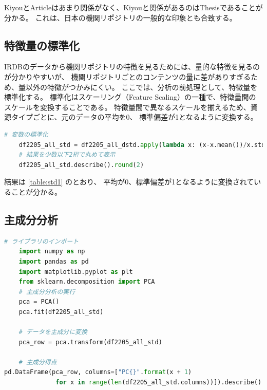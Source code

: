 \documentclass[submit,noauthor]{ono}
\begin{document}
KiyouとArticleはあまり関係がなく、Kiyouと関係があるのはThesisであることが分かる。
これは、日本の機関リポジトリの一般的な印象とも合致する。

\subsection{特徴量の標準化}

IRDBのデータから機関リポジトリの特徴を見るためには、量的な特徴を見るのが分かりやすいが、
機関リポジトリごとのコンテンツの量に差がありすぎるため、量以外の特徴がつかみにくい。
ここでは、分析の前処理として、特徴量を標準化する。
標準化はスケーリング（Feature Scaling）の一種で、特徴量間のスケールを変換することである。
特徴量間で異なるスケールを揃えるため、資源タイプごとに、元のデータの平均を0、
標準偏差が1となるように変換する。

\begin{lstlisting}[language=Python,breaklines]
	# 変数の標準化
	df2205_all_std = df2205_all_dstd.apply(lambda x: (x-x.mean())/x.std(), axis=0)
	# 結果を少数以下2桁で丸めて表示
	df2205_all_std.describe().round(2)
\end{lstlisting}

結果は \ref{table:std1} のとおり、
平均が0、標準偏差が1となるように変換されていることが分かる。

\subsection{主成分分析}

\begin{lstlisting}[language=Python,breaklines]
	# ライブラリのインポート
	import numpy as np
	import pandas as pd
	import matplotlib.pyplot as plt
	from sklearn.decomposition import PCA
	# 主成分分析の実行
	pca = PCA()
	pca.fit(df2205_all_std)

	# データを主成分に変換
	pca_row = pca.transform(df2205_all_std)

	# 主成分得点
pd.DataFrame(pca_row, columns=["PC{}".format(x + 1)
              for x in range(len(df2205_all_std.columns))]).describe().round(2)
\end{lstlisting}

\onecolumn
\end{document}
